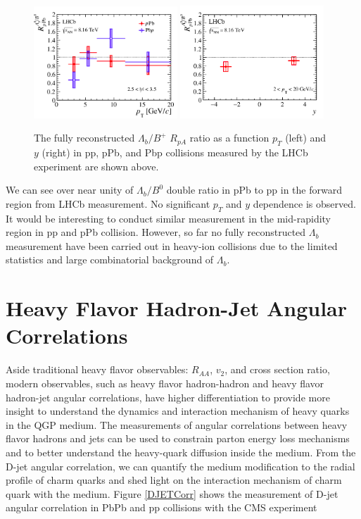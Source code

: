\begin{figure}[hbtp]
\begin{center}
\includegraphics[width=0.48\textwidth]{Figures/Chapter2/LHCbRpAPt.png}
\includegraphics[width=0.48\textwidth]{Figures/Chapter2/LHCbRpAy.png}
\caption{The fully reconstructed $\Lambda_b/B^+$ $R_{pA}$ ratio as a function $p_T$ (left) and $y$ (right) in pp, pPb, and Pbp collisions measured by the LHCb experiment are shown above.}
\label{LHCbLambda}
\end{center}
\end{figure}   


We can see over near unity of $\Lambda_b/B^0$ double ratio in pPb to pp in the forward region from LHCb measurement. No significant $p_T$ and $y$ dependence is observed. It would be interesting to conduct similar measurement in the mid-rapidity region in pp and pPb collision. However, so far no fully reconstructed $\Lambda_b$ measurement have been carried out in heavy-ion collisions due to the limited statistics and large combinatorial background of $\Lambda_b$. 

\clearpage

\section{Heavy Flavor Hadron-Jet Angular Correlations}

Aside traditional heavy flavor observables: $R_{AA}$, $v_{2}$, and cross section ratio, modern observables, such as heavy flavor hadron-hadron and heavy flavor hadron-jet angular correlations, have higher differentiation to provide more insight to understand the dynamics and interaction mechanism of heavy quarks in the QGP medium. The measurements of angular correlations between heavy flavor hadrons and jets can be used to constrain parton energy loss mechanisms and to better understand the heavy-quark diffusion inside the medium. From the D-jet angular correlation, we can quantify the medium modification to the radial profile of charm quarks and shed light on the interaction mechanism of charm quark with the medium. Figure \ref{DJETCorr} shows the measurement of D-jet angular correlation in PbPb and pp collisions with the CMS experiment \cite{CMSDJet}

